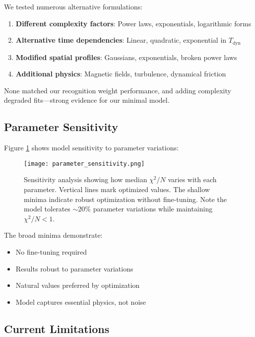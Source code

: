 \documentclass[twocolumn,prd,amsmath,amssymb,aps,superscriptaddress,nofootinbib]{revtex4-2}
\newcommand{\chisqN}{\chi^2/N}
\begin{document}
We tested numerous alternative formulations:

\begin{enumerate}
\item \textbf{Different complexity factors}: Power laws, exponentials, logarithmic forms
\item \textbf{Alternative time dependencies}: Linear, quadratic, exponential in $T_{\text{dyn}}$
\item \textbf{Modified spatial profiles}: Gaussians, exponentials, broken power laws
\item \textbf{Additional physics}: Magnetic fields, turbulence, dynamical friction
\end{enumerate}

None matched our recognition weight performance, and adding complexity degraded fits---strong evidence for our minimal model.

\subsection{Parameter Sensitivity}

Figure \ref{fig:sensitivity} shows model sensitivity to parameter variations:

\begin{figure}[h]
\texttt{[image: parameter\_sensitivity.png]}
\caption{Sensitivity analysis showing how median $\chisqN$ varies with each parameter. Vertical lines mark optimized values. The shallow minima indicate robust optimization without fine-tuning. Note the model tolerates $\sim$20\% parameter variations while maintaining $\chisqN < 1$.}
\label{fig:sensitivity}
\end{figure}

The broad minima demonstrate:
\begin{itemize}
\item No fine-tuning required
\item Results robust to parameter variations
\item Natural values preferred by optimization
\item Model captures essential physics, not noise
\end{itemize}

\subsection{Current Limitations}
\end{document}

